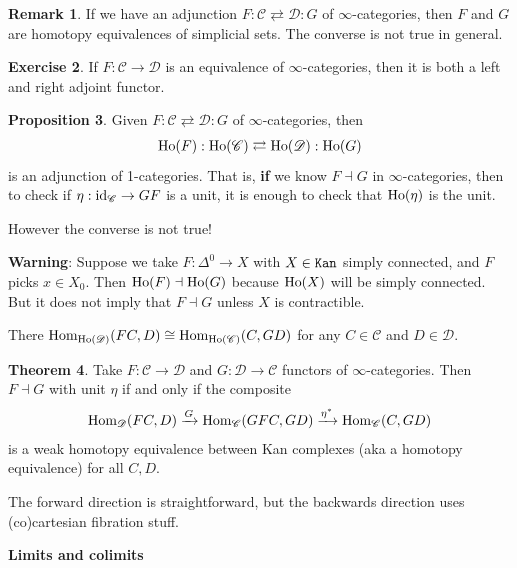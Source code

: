 \documentclass[12pt]{amsart}
\theoremstyle{definition}
\newtheorem{theorem}{Theorem}[section]
\newtheorem{exercise}[theorem]{Exercise}
\newtheorem{proposition}[theorem]{Proposition}
\newtheorem{remark}[theorem]{Remark}
\begin{document}
\begin{remark} If we have an adjunction $F: \mathscr{C} \rightleftarrows \mathscr{D}:G$ of $\infty$-categories, then $F$ and $G$ are homotopy equivalences of simplicial sets. The converse is not true in general.
\end{remark}

\begin{exercise} If $F: \mathscr{C} \to \mathscr{D}$ is an equivalence of $\infty$-categories, then it is both a left and right adjoint functor.
\end{exercise}

\begin{proposition} Given $F: \mathscr{C} \rightleftarrows\mathscr{D}:G$ of $\infty$-categories, then
\begin{align*}
    \text{Ho}(F): \text{Ho}(\mathscr{C}) \rightleftarrows \text{Ho}(\mathscr{D}): \text{Ho}(G)
\end{align*}
is an adjunction of 1-categories. That is, \textbf{if} we know $F\dashv G$ in $\infty$-categories, then to check if $\eta: \text{id}_\mathscr{C} \to GF$ is a unit, it is enough to check that $\text{Ho}(\eta)$ is the unit.
\end{proposition}

However the converse is not true!

\textbf{Warning}: Suppose we take $F:\Delta^0 \to X$ with $X\in \texttt{Kan}$ simply connected, and $F$ picks $x\in X_0$. Then $\text{Ho}(F) \dashv \text{Ho}(G)$ because $\text{Ho}(X)$ will be simply connected. But it does not imply that $F\dashv G$ unless $X$ is contractible.

There $\text{Hom}_{\text{Ho}(\mathscr{D})}(FC,D) \cong \text{Hom}_{\text{Ho}(\mathscr{C})}(C,GD)$ for any $C\in\mathscr{C}$ and $D\in\mathscr{D}$.

\begin{theorem} Take $F:\mathscr{C}\to\mathscr{D}$ and $G:\mathscr{D}\to\mathscr{C}$ functors of $\infty$-categories. Then $F\dashv G$ with unit $\eta$ if and only if the composite
\begin{align*}
    \text{Hom}_\mathscr{D}(FC,D) \xrightarrow{G} \text{Hom}_\mathscr{C}(GFC,GD) \xrightarrow{\eta^\ast} \text{Hom}_\mathscr{C}(C,GD)
\end{align*}
is a weak homotopy equivalence between Kan complexes (aka a homotopy equivalence) for all $C,D$.
\end{theorem}
The forward direction is straightforward, but the backwards direction uses (co)cartesian fibration stuff.

\begin{center}
    \textbf{Limits and colimits}
\end{center}
\end{document}
